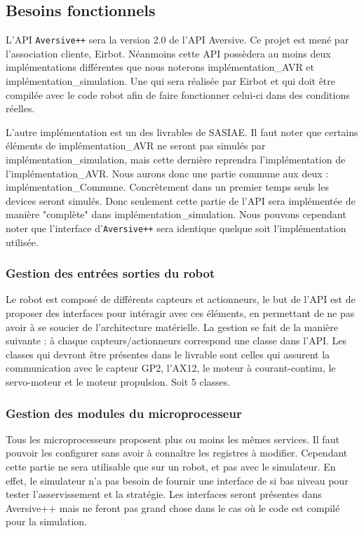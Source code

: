 
\subsection{Besoins fonctionnels}

L'API \texttt{Aversive++} sera la version 2.0 de l'API Aversive. Ce projet est mené par l'association cliente, Eirbot. Néanmoins cette API possèdera au moins deux implémentations différentes que nous noterons implémentation\_AVR et implémentation\_simulation. Une qui sera réalisée par Eirbot et qui doit être compilée avec le code robot afin de faire fonctionner celui-ci dans des conditions réelles. 

L'autre implémentation est un des livrables de SASIAE. Il faut noter que certains éléments de implémentation\_AVR ne seront pas simulés par implémentation\_simulation, mais cette dernière reprendra l'implémentation de l'implémentation\_AVR. Nous aurons donc une partie commune aux deux : implémentation\_Commune. 
Concrètement dans un premier temps seuls les devices seront simulés. Donc seulement cette partie de l'API sera implémentée de manière "complète" dans implémentation\_simulation. Nous pouvons cependant noter que l'interface d'\texttt{Aversive++} sera %
identique quelque soit l'implémentation utilisée.

\subsubsection{Gestion des entrées sorties du robot}

Le robot est composé de différents capteurs et actionneurs, le but de l'API est de proposer des interfaces pour intéragir avec ces éléments, en permettant de ne pas avoir à se soucier de l'architecture matérielle. La gestion se fait de la manière suivante : à chaque capteurs/actionneurs correspond une classe dans l'API. Les classes qui devront être présentes dans le livrable sont celles qui assurent la communication avec le capteur GP2, l'AX12, le moteur à courant-continu, le servo-moteur et le moteur propulsion.
Soit 5 classes.

\subsubsection{Gestion des modules du microprocesseur}

Tous les microprocesseurs proposent plus ou moins les mêmes services. Il faut pouvoir les configurer sans avoir à connaître les registres à modifier. Cependant cette partie ne sera utilisable que sur un robot, et pas avec le simulateur. En effet, le simulateur n'a pas besoin de fournir une interface de si bas niveau pour tester l'asservissement et la stratégie. Les interfaces seront présentes dans Aversive++ mais ne feront pas grand chose dans le cas où le code est compilé pour la simulation.


